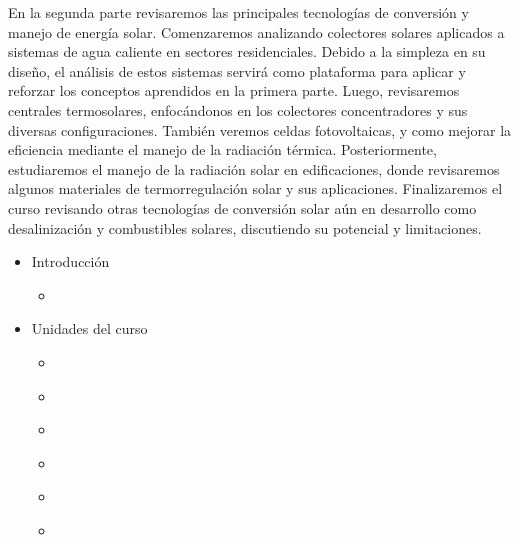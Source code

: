 \documentclass[letterpaper,10pt,english]{jupyterBook}
\begin{document}
\sphinxAtStartPar
En la segunda parte revisaremos las principales tecnologías de conversión y manejo de
energía solar. Comenzaremos analizando colectores solares aplicados a sistemas de agua
caliente en sectores residenciales. Debido a la simpleza en su diseño, el análisis de estos
sistemas servirá como plataforma para aplicar y reforzar los conceptos aprendidos en la
primera parte. Luego, revisaremos centrales termosolares, enfocándonos en los colectores
concentradores y sus diversas configuraciones. También veremos celdas fotovoltaicas, y
como mejorar la eficiencia mediante el manejo de la radiación térmica. Posteriormente,
estudiaremos el manejo de la radiación solar en edificaciones, donde revisaremos algunos
materiales de termorregulación solar y sus aplicaciones. Finalizaremos el curso revisando
otras tecnologías de conversión solar aún en desarrollo como desalinización y combustibles
solares, discutiendo su potencial y limitaciones.
\begin{itemize}
\item {} 
\sphinxAtStartPar
Introducción

\begin{itemize}
\item {} 
\sphinxAtStartPar
{\hyperref[\detokenize{0_introduccion/0_introduccion::doc}]{}}

\end{itemize}
\end{itemize}
\begin{itemize}
\item {} 
\sphinxAtStartPar
Unidades del curso

\begin{itemize}
\item {} 
\sphinxAtStartPar
{\hyperref[\detokenize{1_ondas_electromagneticas/1_ondas_electromagneticas::doc}]{}}

\item {} 
\sphinxAtStartPar
{\hyperref[\detokenize{2_ondas_EM_en_la_materia/2_ondas_EM_en_la_materia::doc}]{}}

\item {} 
\sphinxAtStartPar
{\hyperref[\detokenize{3_Interacci_xf3n_materia-luz/3_Interacci_xf3n_materia-luz::doc}]{}}

\item {} 
\sphinxAtStartPar
{\hyperref[\detokenize{4_Scattering/4_Scattering::doc}]{}}

\item {} 
\sphinxAtStartPar
{\hyperref[\detokenize{5_TransporteRadiativo/5_TransporteRadiativo::doc}]{}}

\item {} 
\sphinxAtStartPar
{\hyperref[\detokenize{6_RadiacionTermica/6_RadiacionTermica::doc}]{}}

\end{itemize}
\end{itemize}
\end{document}
